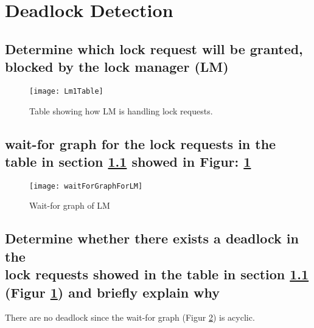 \section{Deadlock Detection}
\subsection{Determine which lock request will be granted, blocked by the lock manager (LM)} \label{lmsection}
\begin{figure}[H]
\centering
\texttt{[image: Lm1Table]}
\caption[Table showing how LM is handling locks]{Table showing how LM is handling lock requests.}
\label{fig:LmTable}
\end{figure}
\pagebreak
\subsection{wait-for graph for the lock requests in the table in section \ref{lmsection} showed in Figur: \ref{fig:LmTable}}
	
\begin{figure}[H]
\centering
\texttt{[image: waitForGraphForLM]}
\caption[Wait-for graph of LM]{}
\caption{Wait-for graph of LM}
\label{fig:waitForGraphForLM}
\end{figure}
\pagebreak
\subsection{Determine whether there exists a deadlock in the \\lock requests showed in the table in section \ref{lmsection} (Figur \ref{fig:LmTable}) and briefly explain why}
There are no deadlock since the wait-for graph (Figur \ref{fig:waitForGraphForLM}) is acyclic.
